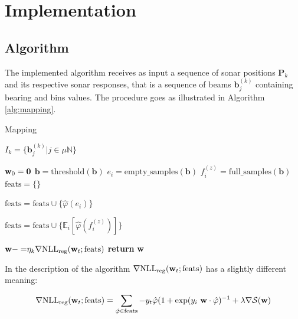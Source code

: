 \section{Implementation}
\subsection{Algorithm}

The implemented algorithm receives as input a sequence of sonar positions
$\mathbf{P}_k$ and its respective sonar responses, that is a sequence of beams
$\mathbf{b}_j^{(k)}$ containing bearing and bins values. The procedure goes
as illustrated in Algorithm \ref{alg:mapping}.


\begin{algorithm}
\caption{Mapping}
\label{alg:mapping}
\begin{algorithmic}

\State $I_k = \{\mathbf{b}_j^{(k)}|j\in \mu\mathbb{N}\}$

\State $\mathrm{\mathbf{w}}_0 = \mathbf{0}$
\State $\mathbf{b} = \mathrm{threshold}(\mathbf{b})$
\State $e_i = \mathrm{empty\_samples}(\mathbf{b})$
\State $f_i^{(z)} = \mathrm{full\_samples}(\mathbf{b})$
\State $\text{feats}=\{\}$

\State $\text{feats}=\text{feats}\cup\{\hat\varphi(e_i)\}$
\EndFor

\State
$\text{feats}=\text{feats}\cup\{\mathbb{E}_i[{
\hat\varphi(f_i^{(z)})}]\}$
\EndFor
\EndFor

\State $\mathrm{\mathbf{w}} {-=}
\eta_k\nabla\text{NLL}_{\text{reg}}(\mathrm{\mathbf{w}}_t;\text{feats})$ 
\EndFor
\State \textbf{return} $\mathrm{\mathbf{w}}$
\EndProcedure
\end{algorithmic}
\end{algorithm}

In the description of the algorithm
$\nabla\text{NLL}_{\text{reg}}(\mathrm{\mathbf{w}}_t;\text{feats})$ has a slightly
different meaning:

\begin{equation*}
\nabla\text{NLL}_{\text{reg}}(\mathrm{\mathbf{w}}_t;\text{feats}) =
\sum_{\hat{\mathbf{\varphi}}\in \text{feats}}
-y_t\hat{\mathbf{\varphi}}(1+\exp(y_i~ \mathrm{\mathbf{w}}\cdot\hat{\mathbf{\varphi}})^{-1} +\lambda\nabla\mathcal{S}(\mathrm{\mathbf{w}})
\end{equation*}


